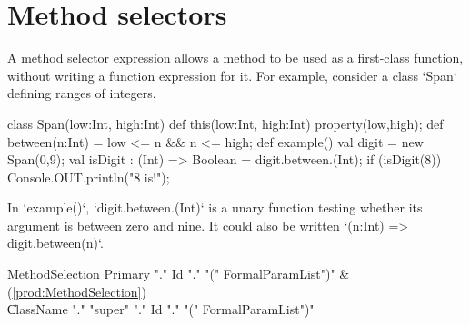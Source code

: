 

\section{Method selectors}
\label{MethodSelectors}

A method selector expression allows a method to be used as a
first-class function, without writing a function expression for it.
For example, consider a class \xcd`Span` defining ranges of integers.  

\begin{xten}
class Span(low:Int, high:Int) {
  def this(low:Int, high:Int) {property(low,high);}
  def between(n:Int) = low <= n && n <= high;
  def example() {
    val digit = new Span(0,9);
    val isDigit : (Int) => Boolean = digit.between.(Int);
    if (isDigit(8)) Console.OUT.println("8 is!");
  }
}
\end{xten}
%
\noindent


In \xcd`example()`, 
\xcd`digit.between.(Int)` 
is a unary function testing whether its argument is between zero
and nine.  It could also be written 
\xcd`(n:Int) => digit.between(n)`.

\begin{bbgrammar}
 MethodSelection    \: Primary \xcd"." Id \xcd"." \xcd"(" FormalParamList\opt \xcd")" & (\ref{prod:MethodSelection})\\%
    \| ClassName \xcd"." \xcd"super"  \xcd"." Id \xcd"." \xcd"(" FormalParamList\opt \xcd")"\\

\end{bbgrammar}


